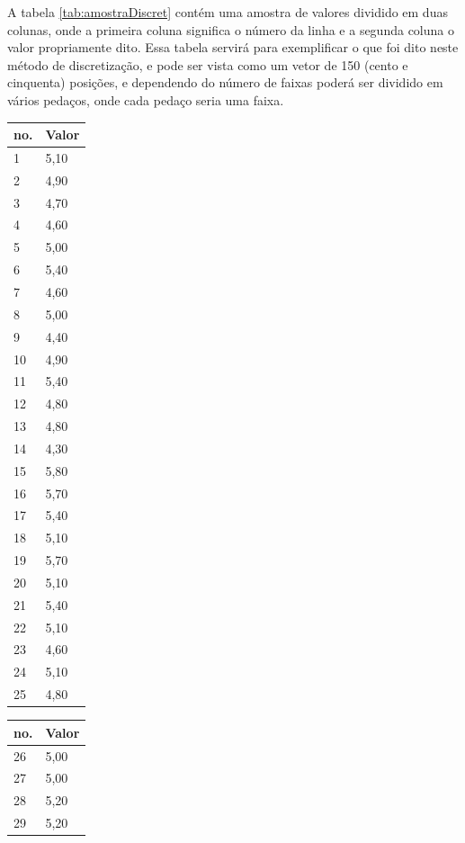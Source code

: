 A tabela \ref{tab:amostraDiscret} contém uma amostra de valores dividido em duas colunas, onde a primeira coluna significa o número da linha e a segunda coluna o valor propriamente dito. Essa tabela servirá para exemplificar o que foi dito neste método de discretização, e pode ser vista como um vetor de 150 (cento e cinquenta) posições, e dependendo do número de faixas poderá ser dividido em vários pedaços, onde cada pedaço seria uma faixa.

\begin{table}[!ht]
\centering

\begin{tabular}{|l|l|}
\hline 
 no. & Valor \\ \hline
1	&	5,10	\\ \hline
2	&	4,90	\\ \hline
3	&	4,70	\\ \hline
4	&	4,60	\\ \hline
5	&	5,00	\\ \hline
6	&	5,40	\\ \hline
7	&	4,60	\\ \hline
8	&	5,00	\\ \hline
9	&	4,40	\\ \hline
10	&	4,90	\\ \hline
11	&	5,40	\\ \hline
12	&	4,80	\\ \hline
13	&	4,80	\\ \hline
14	&	4,30	\\ \hline
15	&	5,80	\\ \hline
16	&	5,70	\\ \hline
17	&	5,40	\\ \hline
18	&	5,10	\\ \hline
19	&	5,70	\\ \hline
20	&	5,10	\\ \hline
21	&	5,40	\\ \hline
22	&	5,10	\\ \hline
23	&	4,60	\\ \hline
24	&	5,10	\\ \hline
25	&	4,80	\\ \hline
\end{tabular}
\begin{tabular}{ |l|l| }
\hline
 no. & Valor \\ \hline
26	&	5,00	\\ \hline
27	&	5,00	\\ \hline
28	&	5,20	\\ \hline
29	&	5,20	\\ \hline

\end{tabular}
\end{table}
